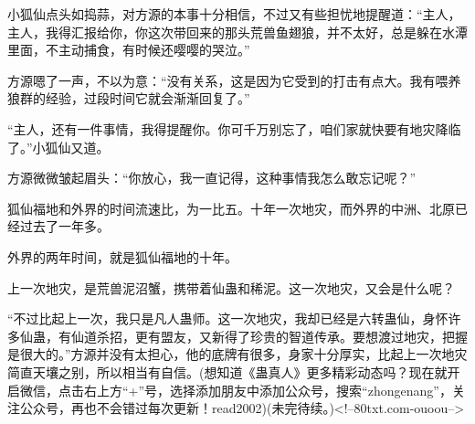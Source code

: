 \begin{this_body}
小狐仙点头如捣蒜，对方源的本事十分相信，不过又有些担忧地提醒道：“主人，主人，我得汇报给你，你这次带回来的那头荒兽鱼翅狼，并不太好，总是躲在水潭里面，不主动捕食，有时候还嘤嘤的哭泣。”

方源嗯了一声，不以为意：“没有关系，这是因为它受到的打击有点大。我有喂养狼群的经验，过段时间它就会渐渐回复了。”

“主人，还有一件事情，我得提醒你。你可千万别忘了，咱们家就快要有地灾降临了。”小狐仙又道。

方源微微皱起眉头：“你放心，我一直记得，这种事情我怎么敢忘记呢？”

狐仙福地和外界的时间流速比，为一比五。十年一次地灾，而外界的中洲、北原已经过去了一年多。

外界的两年时间，就是狐仙福地的十年。

上一次地灾，是荒兽泥沼蟹，携带着仙蛊和稀泥。这一次地灾，又会是什么呢？

“不过比起上一次，我只是凡人蛊师。这一次地灾，我却已经是六转蛊仙，身怀许多仙蛊，有仙道杀招，更有盟友，又新得了珍贵的智道传承。要想渡过地灾，把握是很大的。”方源并没有太担心，他的底牌有很多，身家十分厚实，比起上一次地灾简直天壤之别，所以相当有自信。(想知道《蛊真人》更多精彩动态吗？现在就开启微信，点击右上方“+”号，选择添加朋友中添加公众号，搜索“zhongenang”，关注公众号，再也不会错过每次更新！read2002)(未完待续。)<!--80txt.com-ouoou-->

\end{this_body}

